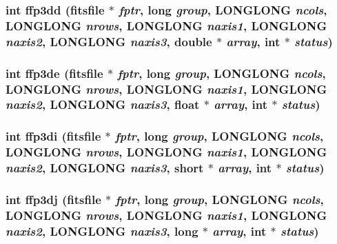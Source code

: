 \subsubsection{\setlength{\rightskip}{0pt plus 5cm}int ffp3dd (\bf{fitsfile} $\ast$ {\em fptr}, long {\em group}, \bf{LONGLONG} {\em ncols}, \bf{LONGLONG} {\em nrows}, \bf{LONGLONG} {\em naxis1}, \bf{LONGLONG} {\em naxis2}, \bf{LONGLONG} {\em naxis3}, double $\ast$ {\em array}, int $\ast$ {\em status})}\label{fitsio_8h_07253c7bb04c4b09022517aff697976b}


\subsubsection{\setlength{\rightskip}{0pt plus 5cm}int ffp3de (\bf{fitsfile} $\ast$ {\em fptr}, long {\em group}, \bf{LONGLONG} {\em ncols}, \bf{LONGLONG} {\em nrows}, \bf{LONGLONG} {\em naxis1}, \bf{LONGLONG} {\em naxis2}, \bf{LONGLONG} {\em naxis3}, float $\ast$ {\em array}, int $\ast$ {\em status})}\label{fitsio_8h_47bab14919cfc2b7d34df2117c7dfdaa}


\subsubsection{\setlength{\rightskip}{0pt plus 5cm}int ffp3di (\bf{fitsfile} $\ast$ {\em fptr}, long {\em group}, \bf{LONGLONG} {\em ncols}, \bf{LONGLONG} {\em nrows}, \bf{LONGLONG} {\em naxis1}, \bf{LONGLONG} {\em naxis2}, \bf{LONGLONG} {\em naxis3}, short $\ast$ {\em array}, int $\ast$ {\em status})}\label{fitsio_8h_61b77356b3271c147b6d8cef61a762ab}


\subsubsection{\setlength{\rightskip}{0pt plus 5cm}int ffp3dj (\bf{fitsfile} $\ast$ {\em fptr}, long {\em group}, \bf{LONGLONG} {\em ncols}, \bf{LONGLONG} {\em nrows}, \bf{LONGLONG} {\em naxis1}, \bf{LONGLONG} {\em naxis2}, \bf{LONGLONG} {\em naxis3}, long $\ast$ {\em array}, int $\ast$ {\em status})}\label{fitsio_8h_282e156fee640697324c7fcb6c5f1edf}


